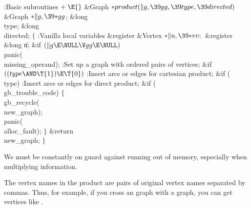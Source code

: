 \B{}:Basic subroutines\X${}\mathrel+\E{}$\6
\1\1\&{Graph} ${}{*}\\{product}(\|g,\39\\{gg},\39\\{type},\39\\{directed}){}$\6
\&{Graph} ${}{*}\|g,\39{*}\\{gg}{}$;\6
\&{long} \\{type};%
\6
\&{long} \\{directed};\2\2\6
${}\{{}$\5
\1:Vanilla local variables\X\5
\hbox{}\6{}\&{register} \&{Vertex} ${}{*}\|u,\39{*}\\{vv};{}$\6
\&{register} \&{long} \|n;\7
\&{if} ${}(\|g\E\NULL\V\\{gg}\E\NULL){}$\1\5
\\{panic}(\\{missing\_operand});\2\6
:Set up a graph with ordered pairs of vertices\X;\6
\&{if} ${}((\\{type}\AND\T{1})\E\T{0}){}$\1\5
:Insert arcs or edges for cartesian product\X;\2\6
\&{if} (\\{type})\1\5
:Insert arcs or edges for direct product\X;\2\6
\&{if} (\\{gb\_trouble\_code})\5
${}\{{}$\1\6
\\{gb\_recycle}(\\{new\_graph});\6
\\{panic}(\\{alloc\_fault});\6
\4${}\}{}$\2\6
\&{return} \\{new\_graph};\6
\4${}\}{}$\2\par
\fi

We must be constantly on guard against running out of memory, especially
when multiplying information.

The vertex names in the product are pairs of original vertex names separated
by commas. Thus, for example, if you cross an  graph with a 
graph, you can get vertices like .

